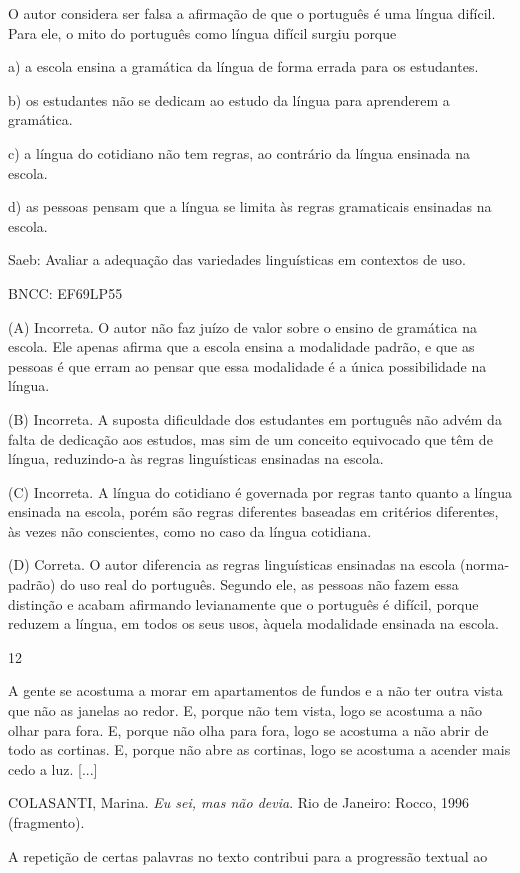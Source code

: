 O autor considera ser falsa a afirmação de que o português é uma língua
difícil. Para ele, o mito do português como língua difícil surgiu porque

a) a escola ensina a gramática da língua de forma errada para os
estudantes.

b) os estudantes não se dedicam ao estudo da língua para aprenderem a
gramática.

c) a língua do cotidiano não tem regras, ao contrário da língua ensinada
na escola.

d) as pessoas pensam que a língua se limita às regras gramaticais
ensinadas na escola.

Saeb: Avaliar a adequação das variedades linguísticas em contextos de
uso.

BNCC: EF69LP55

(A) Incorreta. O autor não faz juízo de valor sobre o ensino de
gramática na escola. Ele apenas afirma que a escola ensina a modalidade
padrão, e que as pessoas é que erram ao pensar que essa modalidade é a
única possibilidade na língua.

(B) Incorreta. A suposta dificuldade dos estudantes em português não
advém da falta de dedicação aos estudos, mas sim de um conceito
equivocado que têm de língua, reduzindo-a às regras linguísticas
ensinadas na escola.

(C) Incorreta. A língua do cotidiano é governada por regras tanto quanto
a língua ensinada na escola, porém são regras diferentes baseadas em
critérios diferentes, às vezes não conscientes, como no caso da língua
cotidiana.

(D) Correta. O autor diferencia as regras linguísticas ensinadas na
escola (norma-padrão) do uso real do português. Segundo ele, as pessoas
não fazem essa distinção e acabam afirmando levianamente que o português
é difícil, porque reduzem a língua, em todos os seus usos, àquela
modalidade ensinada na escola.

\num{12}

A gente se acostuma a morar em apartamentos de fundos e a não ter outra
vista que não as janelas ao redor. E, porque não tem vista, logo se
acostuma a não olhar para fora. E, porque não olha para fora, logo se
acostuma a não abrir de todo as cortinas. E, porque não abre as
cortinas, logo se acostuma a acender mais cedo a luz. {[}...{]}

COLASANTI, Marina. \emph{Eu sei, mas não devia}. Rio de Janeiro: Rocco,
1996 (fragmento).

A repetição de certas palavras no texto contribui para a progressão
textual ao

